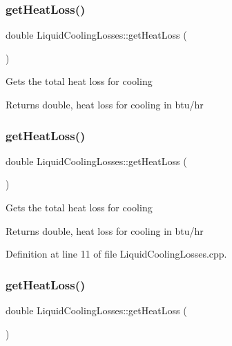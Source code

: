 \subsubsection{\texorpdfstring{get\+Heat\+Loss()}{getHeatLoss()}\hspace{0.1cm}{\footnotesize\ttfamily [1/3]}}
{\footnotesize\ttfamily double Liquid\+Cooling\+Losses\+::get\+Heat\+Loss (\begin{DoxyParamCaption}{ }\end{DoxyParamCaption})}

Gets the total heat loss for cooling

\begin{DoxyReturn}{Returns}
double, heat loss for cooling in btu/hr 
\end{DoxyReturn}
\mbox{\label{class_liquid_cooling_losses_a6a131f8f3141edef7f29df4455c6aee5}} 
\subsubsection{\texorpdfstring{get\+Heat\+Loss()}{getHeatLoss()}\hspace{0.1cm}{\footnotesize\ttfamily [2/3]}}
{\footnotesize\ttfamily double Liquid\+Cooling\+Losses\+::get\+Heat\+Loss (\begin{DoxyParamCaption}{ }\end{DoxyParamCaption})}

Gets the total heat loss for cooling

\begin{DoxyReturn}{Returns}
double, heat loss for cooling in btu/hr 
\end{DoxyReturn}


Definition at line 11 of file Liquid\+Cooling\+Losses.\+cpp.

\mbox{\label{class_liquid_cooling_losses_a6a131f8f3141edef7f29df4455c6aee5}} 
\subsubsection{\texorpdfstring{get\+Heat\+Loss()}{getHeatLoss()}\hspace{0.1cm}{\footnotesize\ttfamily [3/3]}}
{\footnotesize\ttfamily double Liquid\+Cooling\+Losses\+::get\+Heat\+Loss (\begin{DoxyParamCaption}{ }\end{DoxyParamCaption})}

